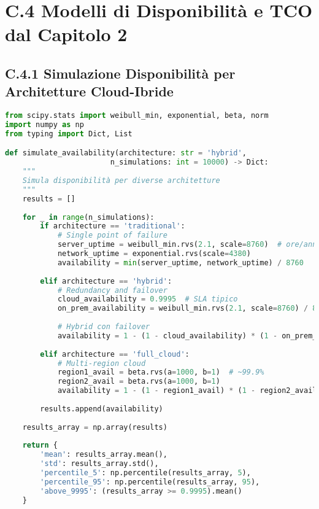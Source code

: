 \section{C.4 Modelli di Disponibilità e TCO dal Capitolo 2}

\subsection{C.4.1 Simulazione Disponibilità per Architetture Cloud-Ibride}

\begin{lstlisting}[language=Python, caption=Modello di Disponibilità Bottom-Up]
from scipy.stats import weibull_min, exponential, beta, norm
import numpy as np
from typing import Dict, List

def simulate_availability(architecture: str = 'hybrid', 
                        n_simulations: int = 10000) -> Dict:
    """
    Simula disponibilità per diverse architetture
    """
    results = []
    
    for _ in range(n_simulations):
        if architecture == 'traditional':
            # Single point of failure
            server_uptime = weibull_min.rvs(2.1, scale=8760)  # ore/anno
            network_uptime = exponential.rvs(scale=4380)
            availability = min(server_uptime, network_uptime) / 8760
            
        elif architecture == 'hybrid':
            # Redundancy and failover
            cloud_availability = 0.9995  # SLA tipico
            on_prem_availability = weibull_min.rvs(2.1, scale=8760) / 8760
            
            # Hybrid con failover
            availability = 1 - (1 - cloud_availability) * (1 - on_prem_availability)
            
        elif architecture == 'full_cloud':
            # Multi-region cloud
            region1_avail = beta.rvs(a=1000, b=1)  # ~99.9%
            region2_avail = beta.rvs(a=1000, b=1)
            availability = 1 - (1 - region1_avail) * (1 - region2_avail)
        
        results.append(availability)
    
    results_array = np.array(results)
    
    return {
        'mean': results_array.mean(),
        'std': results_array.std(),
        'percentile_5': np.percentile(results_array, 5),
        'percentile_95': np.percentile(results_array, 95),
        'above_9995': (results_array >= 0.9995).mean()
    }


\end{lstlisting}
